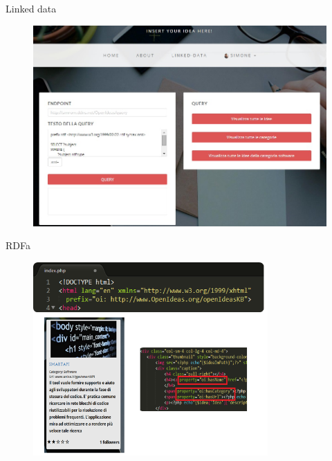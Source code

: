 \documentclass{beamer}
\begin{document}
\begin{frame}{Linked data}
	
	\begin{figure}
		\centering
			\includegraphics[width=1.00\textwidth]{img/linkedData.jpg}
		\label{fig:linkedData}
	\end{figure}
	
\end{frame}

\begin{frame}{RDFa}
	
	\begin{figure}
		\centering
			\includegraphics[width=0.8\textwidth]{img/rdfa.png}
		\label{fig:rdfa}
	\end{figure}
	
\end{frame}
\end{document}
